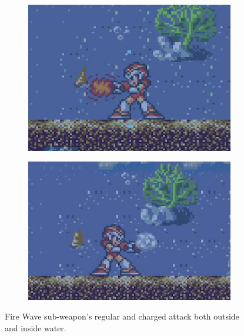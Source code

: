 \begin{figure}[htp]
	\ContinuedFloat
	\centering
	\begin{subfigure}{0.34\linewidth}
		\centering
		\includegraphics[width=\linewidth]{figures/X1/weapons/Fire_wave_2.jpg}
	\end{subfigure}
	\begin{subfigure}{0.36\linewidth}
		\centering
		\includegraphics[width=\linewidth]{figures/X1/weapons/Fire_wave_4.jpg}
	\end{subfigure}
	\caption{Fire Wave sub-weapon's regular and charged attack both outside and inside water.}
\end{figure}


